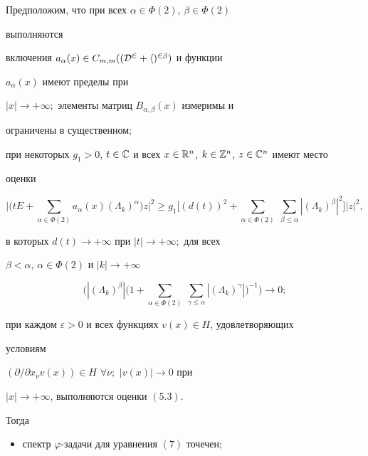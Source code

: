 \begin{thms} 


Предположим, что при всех $\alpha\in\Phi(2)$, $\beta\in\Phi(2)$ 


выполняются 


включения $a_\alpha(x)\in C_{m,m}((\cal D^2+h)^{2\beta})$ и функции 


$a_\alpha(x)$ имеют пределы при  


$|x|\to+\infty;$ элементы матриц $B_{\alpha,\beta}(x)$ измеримы и 


ограничены в существенном$;$ 


при некоторых $g_1>0$, $t\in\Bbb C$ и всех $x\in\Bbb R^n$, $k\in\Bbb 


Z^n$, $z\in\Bbb C^n$ имеют место  


оценки 


\begin{equation} 


\bigg|\bigg(t E+\sum_{\alpha\in\Phi(2)}a_\alpha(x) 


(\Lambda_k)^\alpha\bigg)z\bigg|^2\ge g_1\bigg[(d(t))^2+ 


\sum_{\alpha\in\Phi(2)}\;


\sum_{\beta\le\alpha}|(\Lambda_k)^\beta|^2\bigg]|z|^2, 


\end{equation} 


в которых $d(t)\to+\infty$ при $|t|\to+\infty;$ для всех 


$\beta<\alpha$, $\alpha\in\Phi(2)$ и $|k|\to+\infty$ 


$$ 


\bigg(|(\Lambda_k)^\beta|\bigg(1+ 


\sum_{\alpha\in\Phi(2)}\;


\sum_{\gamma\le\alpha}|(\Lambda_k)^\gamma|\bigg)^{-1}\bigg)\to 0; 


$$ 


при каждом $\varepsilon>0$ и всех функциях $v(x)\in H$, удовлетворяющих 


условиям 


$(\partial/\partial x_\nu v(x))\in H$ $\forall\nu;$ $|v(x)|\to0$ при 


$|x|\to+\infty$, выполняются оценки $(5.3)$. 


 


Тогда 


\begin{itemize} 


\item[1.] спектр $\varphi$-задачи для уравнения $(7)$ точечен$;$ 



\end{itemize}
\end{thms}
